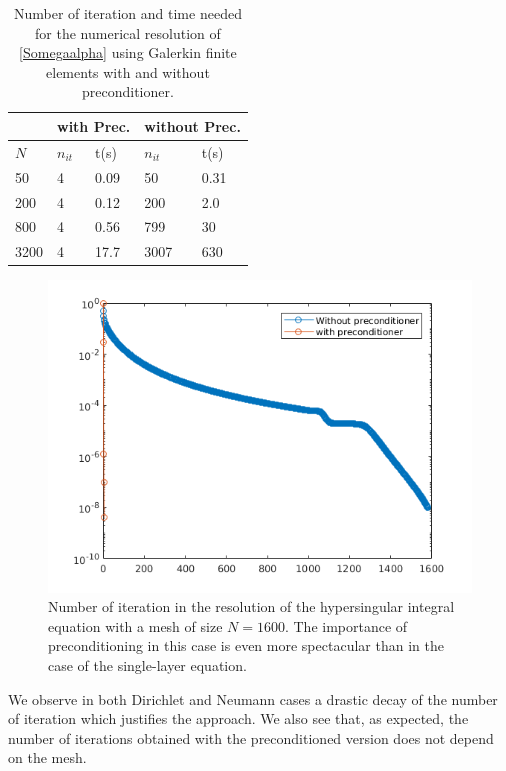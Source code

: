 \documentclass[a4paper]{article}
\begin{document}
\begin{table}[H]
	\begin{center}
		\begin{tabular}{m{4em} | m{4em} | m{4em} | m{4em} | m{4em}} 
			\hline
			\multicolumn{1}{c|}{ }&
			\multicolumn{2}{c|}{with Prec.}&\multicolumn{2}{c}{without Prec.}\\
			\hline
			$N$ & $n_{it}$& t(s) & $n_{it}$ & t(s)\\
			\hline\hline
			50 & 4 & 0.09 & 50 & 0.31\\
			\hline
			200 & 4 & 0.12 & 200 & 2.0\\
			\hline
			800 & 4 & 0.56 & 799 & 30 \\
			\hline
			3200 & 4 & 17.7 & 3007 & 630\\
			\hline
		\end{tabular}
	\end{center}
	\caption{Number of iteration and time needed for the numerical resolution of \eqref{Somegaalpha} using Galerkin finite elements with and without preconditioner.}
	\label{TableNitTimeLaplaceNeumann}
\end{table}
\vspace{-0.7cm}
\begin{figure}[H]
	\centering
	\includegraphics[scale=0.5]{figs/PrecondNeumannLaplaceSeg.png}
	\caption{Number of iteration in the resolution of the hypersingular  integral equation with a mesh of size $N = 1600$. The importance of preconditioning 
	in this case is even more spectacular than in the case of the single-layer equation.}
	\label{FigureNitLaplaceNeumann}
\end{figure}
We observe in both Dirichlet and Neumann cases a drastic decay of the number of iteration which justifies the approach. We also see that, 
as expected, the number of iterations obtained with the preconditioned version does not depend on the mesh.
\end{document}
